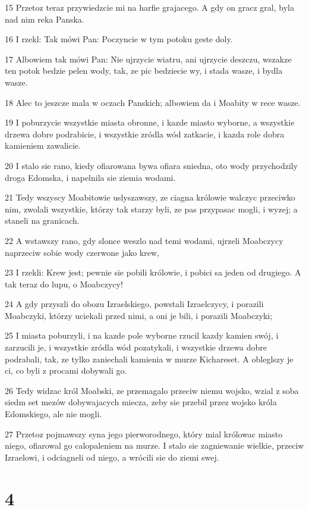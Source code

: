 \par 15 Przetoz teraz przywiedzcie mi na harfie grajacego. A gdy on gracz gral, byla nad nim reka Panska.
\par 16 I rzekl: Tak mówi Pan: Poczyncie w tym potoku geste doly.
\par 17 Albowiem tak mówi Pan: Nie ujrzycie wiatru, ani ujrzycie deszczu, wszakze ten potok bedzie pelen wody, tak, ze pic bedziecie wy, i stada wasze, i bydla wasze.
\par 18 Alec to jeszcze mala w oczach Panskich; albowiem da i Moabity w rece wasze.
\par 19 I poburzycie wszystkie miasta obronne, i kazde miasto wyborne, a wszystkie drzewa dobre podrabicie, i wszystkie zródla wód zatkacie, i kazda role dobra kamieniem zawalicie.
\par 20 I stalo sie rano, kiedy ofiarowana bywa ofiara sniedna, oto wody przychodzily droga Edomska, i napelnila sie ziemia wodami.
\par 21 Tedy wszyscy Moabitowie uslyszawszy, ze ciagna królowie walczyc przeciwko nim, zwolali wszystkie, którzy tak starzy byli, ze pas przypasac mogli, i wyzej; a staneli na granicach.
\par 22 A wstawszy rano, gdy slonce weszlo nad temi wodami, ujrzeli Moabczycy naprzeciw sobie wody czerwone jako krew,
\par 23 I rzekli: Krew jest; pewnie sie pobili królowie, i pobici sa jeden od drugiego. A tak teraz do lupu, o Moabczycy!
\par 24 A gdy przyszli do obozu Izraelskiego, powstali Izraelczycy, i porazili Moabczyki, którzy uciekali przed nimi, a oni je bili, i porazili Moabczyki;
\par 25 I miasta poburzyli, i na kazde pole wyborne rzucil kazdy kamien swój, i zarzucili je, i wszystkie zródla wód pozatykali, i wszystkie drzewa dobre podrabali, tak, ze tylko zaniechali kamienia w murze Kichareset. A obleglszy je ci, co byli z procami dobywali go.
\par 26 Tedy widzac król Moabski, ze przemagalo przeciw niemu wojsko, wzial z soba siedm set mezów dobywajacych miecza, zeby sie przebil przez wojsko króla Edomskiego, ale nie mogli.
\par 27 Przetoz pojmawszy syna jego pierworodnego, który mial królowac miasto niego, ofiarowal go calopaleniem na murze. I stalo sie zagniewanie wielkie, przeciw Izraelowi, i odciagneli od niego, a wrócili sie do ziemi swej.

\chapter{4}

